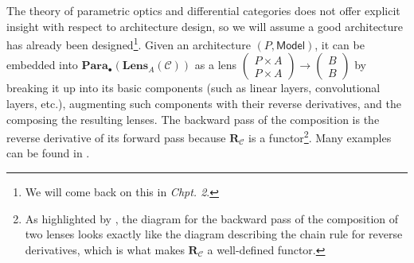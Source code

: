 \documentclass[11pt,a4paper,openright,twoside]{report}
\theoremstyle{plain}
\theoremstyle{definition}
\begin{document}
The theory of parametric optics and differential categories does not offer explicit insight with respect to architecture design, so we will assume a good architecture has already been designed\footnote{We will come back on this in \textit{Chpt. 2}.}. Given an architecture $(P,\mathsf{Model})$, it can be embedded into $\mathbf{Para}_{\bullet}(\mathbf{Lens}_A(\mathcal{C}))$ as a lens $\left(\begin{smallmatrix} P \times A \\ P \times A \end{smallmatrix}\right) \to \left(\begin{smallmatrix} B \\ B \end{smallmatrix}\right)$ by breaking it up into its basic components (such as linear layers, convolutional layers, etc.), augmenting such components with their reverse derivatives, and the composing the resulting lenses. The backward pass of the composition is the reverse derivative of its forward pass because $\mathbf{R}_{\mathcal{C}}$ is a functor\footnote{As highlighted by \cite{shiebler2021category}, the diagram for the backward pass of the composition of two lenses looks exactly like the diagram describing the chain rule for reverse derivatives, which is what makes $\mathbf{R}_{\mathcal{C}}$ a well-defined functor.}. Many examples can be found in \cite{cruttwell2022categorical}.
\end{document}
